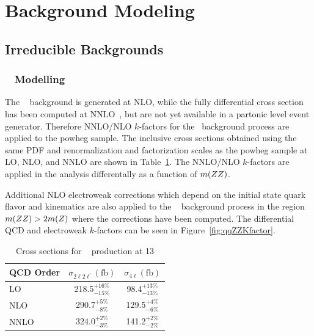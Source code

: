 \section{Background Modeling}

\subsection{Irreducible Backgrounds}
\label{sec:irrbkgd}

\subsubsection{\qqZZ~ Modelling}
\label{sec:redbkgd}

The \qqZZ~ background is generated at NLO, while the fully differential cross section has been computed at 
NNLO~\cite{Grazzini2015407}, but are not yet available in a partonic level event generator. Therefore NNLO/NLO 
$k$-factors for the \qqZZ~background process are applied to the {\sc powheg} sample. The inclusive cross 
sections obtained using the same PDF and renormalization and factorization scales as the {\sc powheg} sample
at LO, NLO, and NNLO are shown in Table~\ref{tab:qqZZXS}. The NNLO/NLO $k$-factors are applied in the analysis
differentally as a function of $m(ZZ)$. 

Additional NLO electroweak corrections which depend on the initial state quark flavor and kinematics
are also applied to the \qqZZ~ background process in the region $m(Z Z)>2m(Z)$ where the 
corrections have been computed. The differential QCD and electroweak $k$-factors can be seen in 
Figure~\ref{fig:qqZZKfactor}.

\begin{table}[h]
    \centering
    \begin{tabular}{|l|c|c|} 
\hline %
QCD Order  & $\sigma_{2\ell2\ell^{\prime}} (\mathrm{fb})$  & $\sigma_{4\ell} (\mathrm{fb})$  \\
\hline %
LO    & 218.5$^{+16\%}_{-15\%}$ & 98.4$^{+13\%}_{-13\%}$ \\
NLO   & 290.7$^{+5\%}_{-8\%}$   & 129.5$^{+4\%}_{-6\%}$ \\
NNLO  & 324.0$^{+2\%}_{-3\%}$   & 141.2$^{+2\%}_{-2\%}$ \\
\hline %
    \end{tabular}
    \caption{Cross sections for \qqZZ~ production at 13 \TeV}
    \label{tab:qqZZXS}
\end{table}

